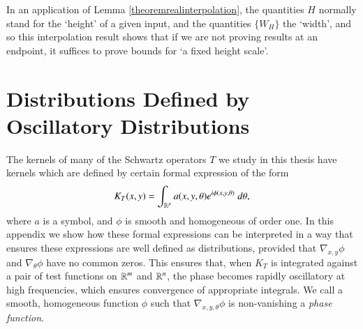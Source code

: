 In an application of Lemma \ref{theoremrealinterpolation}, the quantities $H$ normally stand for the `height' of a given input, and the quantities $\{ W_H \}$ the `width', and so this interpolation result shows that if we are not proving results at an endpoint, it suffices to prove bounds for `a fixed height scale'.









\chapter{Distributions Defined by Oscillatory Distributions} \label{cha:distributions_defined_by_oscillatory_distributions}

The kernels of many of the Schwartz operators $T$ we study in this thesis have kernels which are defined by certain formal expression of the form
%
\begin{equation}
    K_T(x,y) = \int_{\operatorname{\mathbb{R}}^p} a(x,y,\theta) e^{i \phi(x,y,\theta)}\; d\theta,
\end{equation}
%
where $a$ is a symbol, and $\phi$ is smooth and homogeneous of order one.  In this appendix we show how these formal expressions can be interpreted in a way that ensures these expressions are well defined as distributions, provided that $\nabla_{x,y} \phi$ and $\nabla_\theta \phi$ have no common zeros. This ensures that, when $K_T$ is integrated against a pair of test functions on $\operatorname{\mathbb{R}}^m$ and $\operatorname{\mathbb{R}}^n$, the phase becomes rapidly oscillatory at high frequencies, which ensures convergence of appropriate integrals. We call a smooth, homogeneous function $\phi$ such that $\nabla_{x,y,\theta} \phi$ is non-vanishing a \emph{phase function}.

